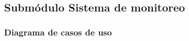 \subsection{Submódulo Sistema de monitoreo}
\subsubsection{Diagrama de casos de uso}






%
%
%
%
%
%
%
%